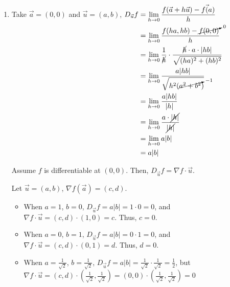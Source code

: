 \documentclass[11pt,fleqn]{book} %
\begin{document}
\begin{enumerate}[label=\alph*)]
    \item Take $\vec{a} = (0,0)$ and $\vec{u} = (a,b)$,
    $\begin{aligned}[t]
        D_{\vec{u}} f
         & = \lim_{h\to0} \frac{f(\vec{a} + h\vec{u}) - f\vec(a)}{h}                                                \\
         & = \lim_{h\to0} \frac{f(ha, hb) - \cancelto{0}{f(0, 0)}}{h}                                               \\
         & = \lim_{h\to0} \frac{1}{\cancel{h}} \cdot \frac{\cancel{h} \cdot a \cdot | hb |}{\sqrt{(ha)^2 + (hb)^2}} \\
         & = \lim_{h\to0} \frac{a | hb |}{\sqrt{h^2(\cancelto{-1}{a^2 + b^2})}}                                     \\
         & = \lim_{h\to0} \frac{a | hb |}{| h |}                                                                    \\
         & = \lim_{h\to0} \frac{a \cdot \cancel{| h |}}{\cancel{| h |}}                                             \\
         & = \lim_{h\to0} a | b |                                                                                   \\
         & = a | b |
    \end{aligned}$

    Assume $f$ is differentiable at $(0,0)$. Then, $D_{\vec{u}} f = \nabla f \cdot \vec{u}$. 

    Let $\vec{u} = (a, b)$, $\nabla f(\vec{a}) = (c, d)$. 

    \begin{itemize}
        \item When $a = 1$, $b = 0$,  $D_{\vec{u}} f = a|b| = 1 \cdot 0 = 0$, and $\nabla f \cdot \vec{u} = (c, d) \cdot (1, 0) = c$. Thus, $c = 0$. 
        \item When $a = 0$, $b = 1$,  $D_{\vec{u}} f = a|b| = 0 \cdot 1 = 0$, and $\nabla f \cdot \vec{u} = (c, d) \cdot (0, 1) = d$. Thus, $d = 0$. 
        \item When $a = \frac{1}{\sqrt{2}}$, $b = \frac{1}{\sqrt{2}}$, $D_{\vec{u}} f = a|b| = \frac{1}{\sqrt{2}} \cdot \frac{1}{\sqrt{2}} = \frac{1}{2}$, but $\nabla f \cdot \vec{u} = (c, d) \cdot \left(\frac{1}{\sqrt{2}}, \frac{1}{\sqrt{2}} \right) = (0,0) \cdot \left(\frac{1}{\sqrt{2}}, \frac{1}{\sqrt{2}} \right) = 0$
    \end{itemize}


\end{enumerate}
\end{document}
